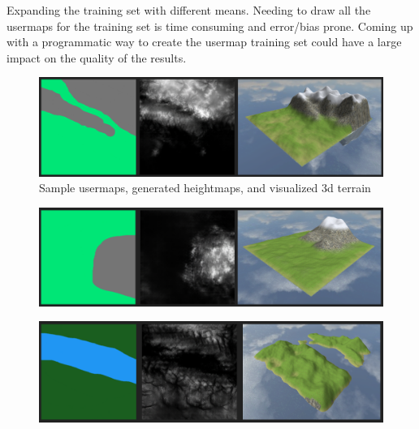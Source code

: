 \documentclass[twocolumn]{article}
\begin{document}
	Expanding the training set with different means. Needing to draw all the usermaps for the training set is time consuming and error/bias prone. Coming up with a programmatic way to create the usermap training set could have a large impact on the quality of the results.

	
	
	
	\clearpage
	
	\begin{figure}[h!]
	\caption{Sample usermaps, generated heightmaps, and visualized 3d terrain}	
	\includegraphics[width=2\columnwidth]{viz-1.png} 
	\end{figure}
	
	\begin{figure}[h!]
	\includegraphics[width=2\columnwidth]{viz-2.png} 
	\end{figure}
	
	\begin{figure}[h!]
	\includegraphics[width=2\columnwidth]{viz-3.png} 
	\end{figure}
	
	
	
		
  
\end{document}
